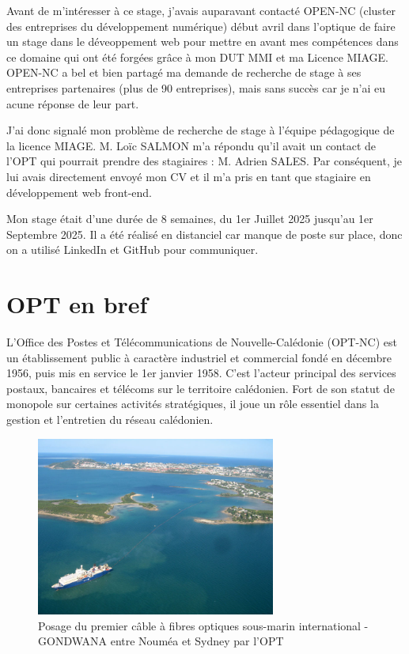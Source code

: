 \documentclass[12pt,a4paper]{report}
\begin{document}
\vspace{1cm}
Avant de m'intéresser à ce stage, j'avais auparavant contacté OPEN-NC (cluster des entreprises du développement numérique) début avril dans l'optique de faire un stage dans le déveoppement web pour mettre en avant mes compétences dans ce domaine qui ont été forgées grâce à mon DUT MMI et ma Licence MIAGE. OPEN-NC a bel et bien partagé ma demande de recherche de stage à ses entreprises partenaires (plus de 90 entreprises), mais sans succès car je n'ai eu acune réponse de leur part.

\vspace{1cm}
J'ai donc signalé mon problème de recherche de stage à l'équipe pédagogique de la licence MIAGE. M. Loïc SALMON m'a répondu qu'il avait un contact de l'OPT qui pourrait prendre des stagiaires : M. Adrien SALES. Par conséquent, je lui avais directement envoyé mon CV et il m'a pris en tant que stagiaire en développement web front-end.

\vspace{1cm}
Mon stage était d'une durée de 8 semaines, du 1er Juillet 2025 jusqu'au 1er Septembre 2025. Il a été réalisé en distanciel car manque de poste sur place, donc on a utilisé LinkedIn et GitHub pour communiquer.


\section{OPT en bref}
L’Office des Postes et Télécommunications de Nouvelle-Calédonie (OPT-NC) est un établissement public à caractère industriel et commercial fondé en décembre 1956, puis mis en service le 1er janvier 1958. C'est l’acteur principal des services postaux, bancaires et télécoms sur le territoire calédonien. Fort de son statut de monopole sur certaines activités stratégiques, il joue un rôle essentiel dans la gestion et l'entretien du réseau calédonien.

\vspace{1cm}

\begin{figure}[h] %
    \centering
    \includegraphics[width=0.7\textwidth]{ressources_rapport/pose-cable-gondwana.jpg}
    \caption{Posage du premier câble à fibres optiques sous-marin international - GONDWANA entre Nouméa et Sydney par l'OPT}
    \label{fig:exemple}
\end{figure}
\newpage
\end{document}
